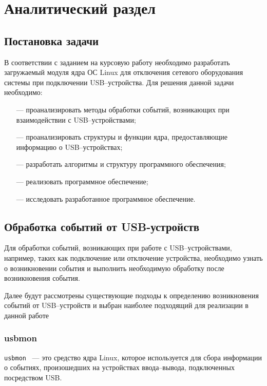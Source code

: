 \chapter{Аналитический раздел}

\section{Постановка задачи}

В соответствии с заданием на курсовую работу необходимо разработать загружаемый модуля ядра ОС Linux для отключения сетевого оборудования системы при подключении USB–устройства. Для решения данной задачи необходимо:

\begin{itemize}
	\item[---] проанализировать методы обработки событий, возникающих при взаимодействии с USB–устройствами;
	\item[---] проанализировать структуры и функции ядра, предоставляющие информацию о USB–устройствах;
	\item[---] разработать алгоритмы и структуру программного обеспечения;
	\item[---] реализовать программное обеспечение;
	\item[---] исследовать разработанное программное обеспечение.
\end{itemize}

\section{Обработка событий от USB-устройств}

Для обработки событий, возникающих при работе с USB–устройствами, например, таких как подключение или отключение устройства, необходимо узнать о возникновении события и выполнить необходимую обработку после возникновения события.

Далее будут рассмотрены существующие подходы к определению возникновения событий от USB–устройств и выбран наиболее подходящий для реализации в данной работе

\subsection{usbmon}

\texttt{usbmon}~\cite{usbmon} --- это средство ядра Linux, которое используется для сбора информации о событиях, произошедших на устройствах ввода--вывода, подключенных посредством USB.

